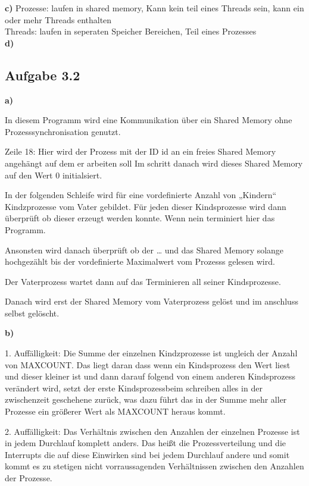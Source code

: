 \documentclass[a4paper,graphics,11pt]{article}
\newcommand{\aufgabe}[1]{\subsection*{Aufgabe #1}}
\begin{document}
\textbf{c)}
Prozesse: laufen in shared memory, Kann kein teil eines Threads sein, kann ein oder mehr Threads enthalten\\
Threads: laufen in seperaten Speicher Bereichen, Teil eines Prozesses \\

\textbf{d)}

\newpage

\aufgabe{3.2}

\textbf{a)}

In diesem Programm wird eine Kommunikation über ein Shared Memory ohne Prozesssynchronisation genutzt.

Zeile 18:
Hier wird der Prozess mit der ID id an ein freies Shared Memory angehängt auf dem er arbeiten soll
Im schritt danach wird dieses Shared Memory auf den Wert 0 initialsiert.

In der folgenden Schleife wird für eine vordefinierte Anzahl von „Kindern“ Kindzprozesse vom Vater gebildet.
Für jeden dieser Kindsprozesse wird dann überprüft ob dieser erzeugt werden konnte. Wenn nein terminiert hier das Programm.

Ansonsten wird danach überprüft ob der … und das Shared Memory solange hochgezählt bis der vordefinierte Maximalwert vom Prozesss gelesen wird.

Der Vaterprozess wartet dann auf das Terminieren all seiner Kindsprozesse.

Danach wird erst der Shared Memory vom Vaterprozess gelöst und im anschluss selbst gelöscht.


\textbf{b)}

1. Auffälligkeit:
Die Summe der einzelnen Kindzprozesse ist ungleich der Anzahl von MAXCOUNT. Das liegt daran dass wenn ein Kindsprozess den Wert liest und dieser kleiner ist und dann darauf folgend von einem anderen Kindsprozess verändert wird, setzt der erste Kindsprozessbeim schreiben alles in der zwischenzeit geschehene zurück, was dazu führt das in der Summe mehr aller Prozesse ein größerer Wert als MAXCOUNT heraus kommt.

2. Auffälligkeit:
Das Verhältnis zwischen den Anzahlen der einzelnen Prozesse ist in jedem Durchlauf komplett anders. Das heißt die Prozessverteilung und die Interrupts die auf diese Einwirken sind bei jedem Durchlauf andere und somit kommt es zu stetigen nicht vorraussagenden Verhältnissen zwischen den Anzahlen der Prozesse.
\end{document}

